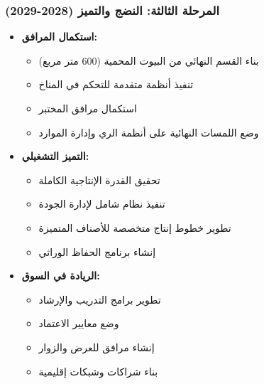 \subsubsection{المرحلة الثالثة: النضج والتميز (2028-2029)}
\begin{itemize}
    \item \textbf{استكمال المرافق:}
    \begin{itemize}
        \item بناء القسم النهائي من البيوت المحمية (600 متر مربع)
        \item تنفيذ أنظمة متقدمة للتحكم في المناخ
        \item استكمال مرافق المختبر
        \item وضع اللمسات النهائية على أنظمة الري وإدارة الموارد
    \end{itemize}
    
    \item \textbf{التميز التشغيلي:}
    \begin{itemize}
        \item تحقيق القدرة الإنتاجية الكاملة
        \item تنفيذ نظام شامل لإدارة الجودة
        \item تطوير خطوط إنتاج متخصصة للأصناف المتميزة
        \item إنشاء برنامج الحفاظ الوراثي
    \end{itemize}
    
    \item \textbf{الريادة في السوق:}
    \begin{itemize}
        \item تطوير برامج التدريب والإرشاد
        \item وضع معايير الاعتماد
        \item إنشاء مرافق للعرض والزوار
        \item بناء شراكات وشبكات إقليمية
    \end{itemize}
\end{itemize}

